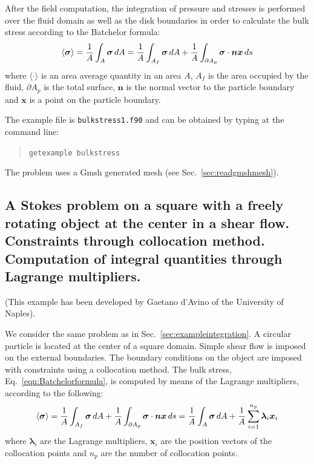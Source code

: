 After the field computation, the integration of pressure and stresses is performed over the fluid domain as well
as the disk boundaries in order to calculate the bulk stress according to the Batchelor formula:
\begin{equation}
\langle \boldsymbol{\sigma}\rangle=\frac{1}{A}\int_{A}\boldsymbol{\sigma}\,d A=\frac{1}{A}\int_{A_{f}}
\boldsymbol{\sigma}\,d A+\frac{1}{A}\int_{\partial
A_{p}}\boldsymbol{\sigma}\cdot \boldsymbol{nx}\,d s
\label{eqn:Batchelorformula}
\end{equation}
where $\langle \cdot \rangle$ is an area average quantity in an area $A$, $A_{f}$ is the area occupied by the
fluid, $\partial A_{p}$ is the total surface, $\boldsymbol{n}$ is the normal vector to the particle boundary and
$\boldsymbol{x}$ is a point on the particle boundary.

The example file is \texttt{bulkstress1.f90} and can be obtained by typing at the
command line:
\begin{quote}
   \texttt{getexample bulkstress}
\end{quote}
The problem uses a Gmsh generated mesh 
(see Sec.~\ref{sec:readgmshmesh}).

\subsection{A Stokes problem on a square with a freely rotating object at the
center in a shear flow. Constraints through collocation method.
Computation of integral quantities through Lagrange multipliers.}
\label{sec:exampleintegration2}

(This example has been developed by Gaetano d'Avino of the University of Naples).

We consider the same problem as in Sec.~\ref{sec:exampleintegration}.
A circular particle is
located at the center of a square domain. Simple shear flow is
imposed on the external boundaries. The boundary conditions on the object are
imposed with constraints using a collocation method. 
The bulk stress, Eq.~\eqref{eqn:Batchelorformula},
 is computed by means of the Lagrange
multipliers, according to the following:
\begin{equation}
\langle\boldsymbol{\sigma}\rangle=
\frac{1}{A}\int_{A_{f}}\boldsymbol{\sigma}\,d A+\frac{1}{A}\int_{\partial
A_{p}}\boldsymbol{\sigma}\cdot\boldsymbol{n}\boldsymbol{x}\,d s=
\frac{1}{A}\int_{A}\boldsymbol{\sigma}\,d A+\frac{1}{A}\sum_{i=1}^{n_{p}}
\boldsymbol{\lambda}_i\boldsymbol{x}_i
\label{eq:bulkstress2}
\end{equation}
where $\boldsymbol{\lambda}_i$ are the Lagrange multipliers, $\boldsymbol{x}_i$ are
the position vectors of the collocation points and $n_{p}$ are
the number of collocation points.

